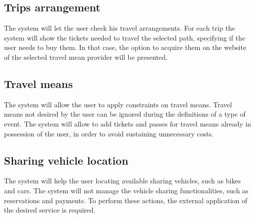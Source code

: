 \subsection{Trips arrangement}
The system will let the user check his travel arrangements.
\newline
For each trip the system will show the tickets needed to travel the selected path, specifying if the user needs to buy them. In that case, the option to acquire them on the website of the selected travel mean provider will be presented.

\subsection{Travel means}
The system will allow the user to apply constraints on travel means.
\newline
Travel means not desired by the user can be ignored during the definitions of a type of event.
\newline
The system will allow to add tickets and passes for travel means already in possession of the user, in order to avoid sustaining unnecessary costs.

\subsection{Sharing vehicle location}
The system will help the user locating available sharing vehicles, such as bikes and cars.
\newline
The system will not manage the vehicle sharing functionalities, such as reservations and payments. To perform these actions, the external application of the desired service is required.